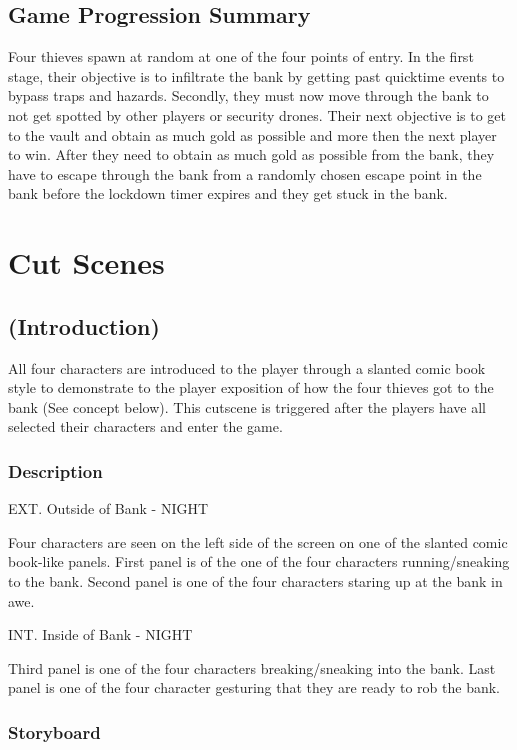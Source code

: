 \documentclass[14pt]{report}
\begin{document}
\subsection{Game Progression Summary}

Four thieves spawn at random at one of the four points of entry. In the first stage, their objective is to infiltrate the bank by getting past quicktime events to bypass traps and hazards. Secondly, they must now move through the bank to not get spotted by other players or security drones. 
Their next objective is to get to the vault and obtain as much gold as possible and more then the next player to win. After they need to obtain as much gold as possible from the bank, they have to escape through the bank from a randomly chosen escape point in the bank before the lockdown timer expires and they get stuck in the bank.

\section{Cut Scenes}
\subsection{(Introduction)}

All four characters are introduced to the player through a slanted comic book style to demonstrate to the player exposition of how the four thieves got to the bank (See concept below). This cutscene is triggered after the players have all selected their characters and enter the game.

\subsubsection{Description}

EXT. Outside of Bank - NIGHT

Four characters are seen on the left side of the screen on one of the slanted comic book-like panels. 
First panel is of the one of the four characters running/sneaking to the bank.
Second panel is one of the four characters staring up at the bank in awe.
	
INT. Inside of Bank - NIGHT

Third panel is one of the four characters breaking/sneaking into the bank.
Last panel is one of the four character gesturing that they are ready to rob the bank.

\subsubsection{Storyboard}
\end{document}
